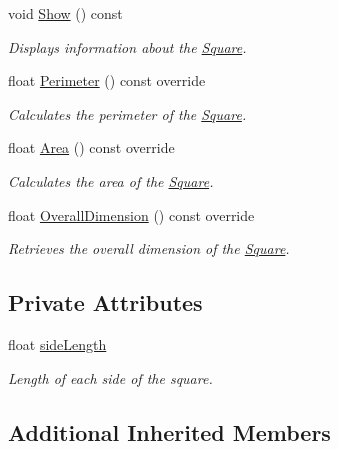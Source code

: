 \begin{DoxyCompactItemize}
\mbox{\label{class_square_a611a452eb35f4426bc508c44a38ceaa2}} 
void \mbox{\hyperlink{class_square_a611a452eb35f4426bc508c44a38ceaa2}{Show}} () const
\begin{DoxyCompactList}\small\item\em Displays information about the \mbox{\hyperlink{class_square}{Square}}. \end{DoxyCompactList}\item 
float \mbox{\hyperlink{class_square_a460111c0c374f9864d00316dcfe35dba}{Perimeter}} () const override
\begin{DoxyCompactList}\small\item\em Calculates the perimeter of the \mbox{\hyperlink{class_square}{Square}}. \end{DoxyCompactList}\item 
float \mbox{\hyperlink{class_square_a514f98666ebe6c9d43bc454e3d5819a4}{Area}} () const override
\begin{DoxyCompactList}\small\item\em Calculates the area of the \mbox{\hyperlink{class_square}{Square}}. \end{DoxyCompactList}\item 
float \mbox{\hyperlink{class_square_abf97ea232b41e2060eff7a3d8b1b60d2}{Overall\+Dimension}} () const override
\begin{DoxyCompactList}\small\item\em Retrieves the overall dimension of the \mbox{\hyperlink{class_square}{Square}}. \end{DoxyCompactList}\end{DoxyCompactItemize}
\subsection*{Private Attributes}
\begin{DoxyCompactItemize}
\item 
\mbox{\label{class_square_a90b0c01a55a5f061e96b2d88724b130d}} 
float \mbox{\hyperlink{class_square_a90b0c01a55a5f061e96b2d88724b130d}{side\+Length}}
\begin{DoxyCompactList}\small\item\em Length of each side of the square. \end{DoxyCompactList}\end{DoxyCompactItemize}
\subsection*{Additional Inherited Members}


